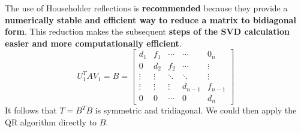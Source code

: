 \highspace
The use of Householder reflections is \textbf{recommended} because they provide a \textbf{numerically stable and efficient way to reduce a matrix to bidiagonal form}. This reduction makes the subsequent \textbf{steps of the SVD calculation easier and more computationally efficient}.
\begin{equation*}
    U_{1}^{T}AV_{1} = B = \begin{bmatrix}
        d_{1} & f_{1} & \cdots & \cdots & 0_{n} \\
        0 & d_{2} & f_{2} & \cdots & \vdots \\
        \vdots & \vdots & \ddots & \ddots & \vdots \\
        \vdots & \vdots & \vdots & d_{n-1} & f_{n-1} \\
        0 & 0 & \cdots & 0 & d_{n}
    \end{bmatrix}
\end{equation*}
It follows that $T = B^{T}B$ is symmetric and tridiagonal. We could then apply the QR algorithm directly to $B$.